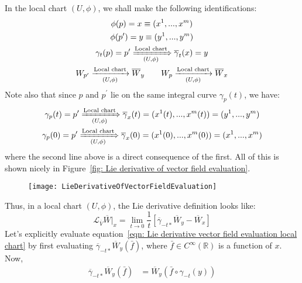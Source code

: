        In the local chart $(U,\phi)$, we shall make the following
        identifications:
        \begin{gather*}
          \phi(p) = x \equiv (x^1,...,x^m)\\
          \phi(p^\prime) = y \equiv (y^1,...,y^m)\\
          \gamma_t(p) = p^\prime \xRightarrow[(U,\phi)]{\text{Local chart}}
          \overline{\gamma}_t(x) = y \\
          W_{p^\prime} \xrightarrow[(U,\phi)]{\text{Local chart}}
          \overline{W}_y \quad \quad
          W_{p} \xrightarrow[(U,\phi)]{\text{Local chart}}
          \overline{W}_x
        \end{gather*}
        Note also that since $p$ and $p^\prime$ lie on the same integral
        curve $\gamma_p(t)$, we have:
        \begin{gather*}
          \gamma_p(t) = p^\prime \xRightarrow[(U,\phi)]{\text{Local chart}}
          \overline{\gamma}_x(t) = (x^1(t),...,x^m(t)) = (y^1,...,y^m) \\
          \gamma_p(0) = p^\prime \xRightarrow[(U,\phi)]{\text{Local chart}}
          \overline{\gamma}_x(0) = (x^1(0),...,x^m(0)) = (x^1,...,x^m)
        \end{gather*}
        where the second line above is a direct consequence of the first. All
        of this is shown nicely in Figure~\ref{fig: Lie derivative of vector
        field evaluation}.
        \begin{figure}
          \centering
          \texttt{[image: LieDerivativeOfVectorFieldEvaluation]}
          \caption[]{}
          \label{fig: Lie derivative of vector field evaluation}
        \end{figure}
        Thus, in a local chart $(U,\phi)$, the Lie derivative definition
        looks like:
        \begin{equation}
          \label{eqn: Lie derivative vector field evaluation local chart}
          \mathcal{L}_{\overline{V}}\overline{W}\Bigr|_x = \lim_{t \to
          0}\frac{1}{t}\left[\overline{\gamma}_{-t*}\overline{W}_y -
          \overline{W}_x \right]
        \end{equation}
        Let's explicitly evaluate equation~\ref{eqn: Lie derivative vector
        field evaluation local chart} by first evaluating
        $\overline{\gamma}_{-t*}\overline{W}_y\left(\bar{f}\right)$, where
        $\bar{f} \in C^\infty(\mathbb{R})$ is a function of $x$. Now,
        \begin{align*}
          \overline{\gamma}_{-t*}\overline{W}_y\left(\bar{f}\right) 
          &= \overline{W}_y\left(\bar{f}\circ \gamma_{-t}(y)\right)
        \end{align*}
